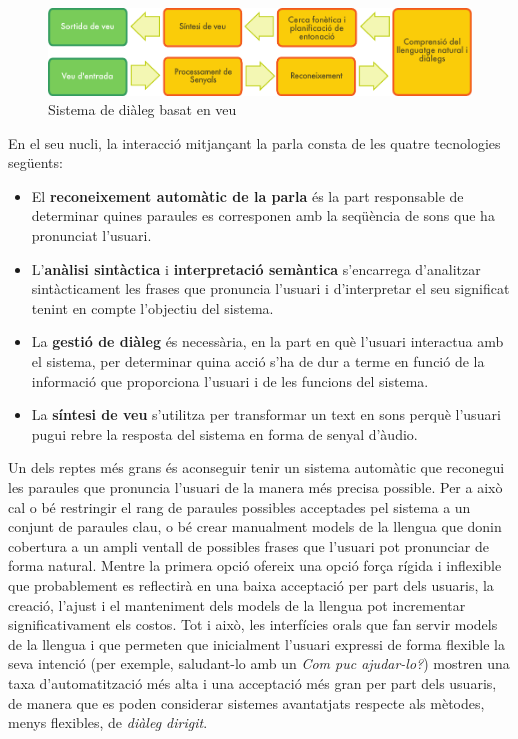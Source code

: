 \begin{multicols}{2}
\begin{figure}[htb]
  \vspace{-9mm}
  \center  \includegraphics[width=\textwidth]{../_media/catalan/simple_speech-based_dialogue_architecture}
  \center
  \caption{Sistema de diàleg basat en veu}
  \label{fig:dialoguearch_ca}
\end{figure}

En el seu nucli, la interacció mitjançant la parla consta de les quatre tecnologies següents:
\begin{itemize}
\item El \textbf{reconeixement automàtic de la parla} és la part responsable de determinar quines paraules es corresponen amb la seqüència de sons que ha pronunciat l’usuari.
\item L’\textbf{anàlisi sintàctica} i \textbf{interpretació semàntica} s’encarrega d’analitzar sintàcticament les frases que pronuncia l’usuari i d’interpretar el seu significat tenint en compte l’objectiu del sistema.
\item La \textbf{gestió de diàleg} és necessària, en la part en què l’usuari interactua amb el sistema, per determinar quina acció s’ha de dur a terme en funció de la informació que proporciona l’usuari i de les funcions del sistema.
\item La \textbf{síntesi de veu} s’utilitza per transformar un text en sons perquè l’usuari pugui rebre la resposta del sistema en forma de senyal d’àudio. 
\end{itemize}

Un dels reptes més grans és aconseguir tenir un sistema automàtic que reconegui les paraules que pronuncia l’usuari de la manera més precisa possible. Per a això cal o bé restringir el rang de paraules possibles acceptades pel sistema a un conjunt de paraules clau, o bé crear manualment models de la llengua que donin cobertura a un ampli ventall de possibles frases que l’usuari pot pronunciar de forma natural. Mentre la primera opció ofereix una opció força rígida i inflexible que probablement es reflectirà en una baixa acceptació per part dels usuaris, la creació, l’ajust i el manteniment dels models de la llengua pot incrementar significativament els costos. Tot i això, les interfícies orals que fan servir models de la llengua i que permeten que inicialment l’usuari expressi de forma flexible la seva intenció (per exemple, saludant-lo amb un \textit{Com puc ajudar-lo?}) mostren una taxa d’automatització més alta i una acceptació més gran per part dels usuaris, de manera que es poden considerar sistemes avantatjats respecte als mètodes, menys flexibles, de \textit{diàleg dirigit}.


\end{multicols}
